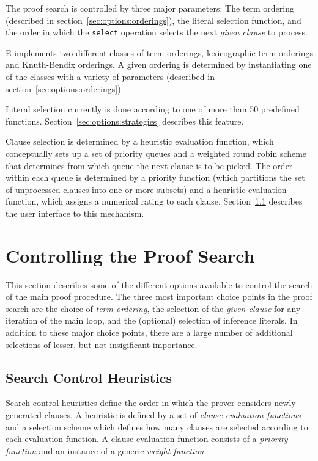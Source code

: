 \documentclass{report}
\begin{document}
The proof search is controlled by three major parameters: The term
ordering (described in section~\ref{sec:options:orderings}), the
literal selection function, and the order in which the \texttt{select}
operation selects the next \emph{given clause} to process.

E implements two different classes of term orderings, lexicographic term orderings and Knuth-Bendix
orderings. A given ordering is determined by instantiating one of the
classes with a variety of parameters (described in
section~\ref{sec:options:orderings}).

Literal selection currently is done according
to one of more than 50 predefined
functions. Section~\ref{sec:options:strategies} describes this
feature.

Clause selection is determined by a heuristic evaluation function,
which conceptually sets up a set of priority queues and a weighted
round robin scheme that determines from which queue the next clause is
to be picked. The order within each queue is determined by a priority
function (which partitions the set of unprocessed clauses into one or
more subsets) and a heuristic evaluation function, which assigns a
numerical rating to each clause.  Section~\ref{sec:options:heuristics}
describes the user interface to this mechanism.



\chapter{Controlling the Proof Search}
\label{sec:options}

This section describes some of the different options available to
control the search of the main proof procedure. The three most
important choice points in the proof search are the choice of
\emph{term ordering}, the selection of the
\emph{given clause} for any iteration of the main
loop, and the (optional) selection of inference
literals. In addition to these major choice
points, there are a large number of additional selections of lesser,
but not insigificant importance.


\section{Search Control Heuristics}
\label{sec:options:heuristics}

Search control heuristics define the order in which the prover
considers newly generated clauses. A heuristic is defined by a set of
\emph{clause evaluation functions} and a selection scheme which defines
how many clauses are selected according to each evaluation function. A
clause evaluation function consists of a \emph{priority function} and
an instance of a generic \emph{weight function}.
\end{document}
